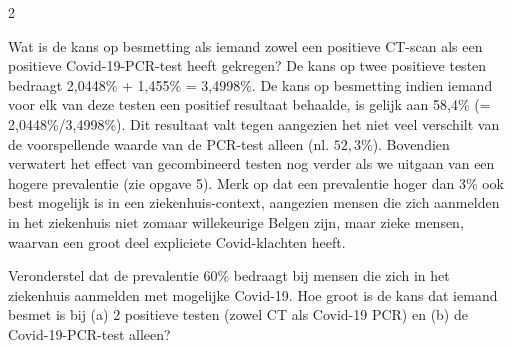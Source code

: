 \begin{multicols}{2}

Wat is de kans op besmetting als iemand zowel een positieve CT-scan als een positieve Covid-19-PCR-test heeft gekregen? De kans op twee positieve testen bedraagt 2,0448\% + 1,455\% = 3,4998\%. De kans op besmetting indien iemand voor elk van deze testen een positief resultaat behaalde, is gelijk aan 58,4\% (= 2,0448\%/3,4998\%). Dit resultaat valt tegen aangezien het niet veel verschilt van de voorspellende waarde van de PCR-test alleen (nl. $52,3\%$). Bovendien verwatert het effect van gecombineerd testen nog verder als we uitgaan van een hogere prevalentie (zie opgave 5). Merk op dat een prevalentie hoger dan 3\% ook best mogelijk is in een ziekenhuis-context, aangezien mensen die zich aanmelden in het ziekenhuis niet zomaar willekeurige Belgen zijn, maar zieke mensen, waarvan een groot deel expliciete Covid-klachten heeft.
\end{multicols}

Veronderstel dat de prevalentie 60$\%$ bedraagt bij mensen die zich in het ziekenhuis aanmelden met mogelijke Covid-19. Hoe groot is de kans dat iemand besmet is bij (a) 2 positieve testen (zowel CT als Covid-19 PCR) en (b) de Covid-19-PCR-test alleen?
		

